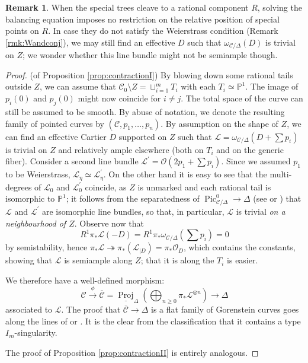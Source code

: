 \documentclass[11pt]{amsart}
\newcommand{\PP}{\mathbb P}
\newcommand{\OO}{\mathcal O}
\renewcommand{\to}{\rightarrow}
\newcommand{\dvr}{\Delta}
\newcommand{\Pic}{\operatorname{Pic}}
\theoremstyle{plain}
\theoremstyle{definition}
\newtheorem{rem}[thm]{Remark}
\begin{document}
\begin{rem}\label{rmk:extra_conjugate}
When the special trees cleave to a rational component $R$, solving the balancing equation imposes no restriction on the relative position of special points on $R$. In case they do not satisfy the Weierstrass condition (Remark \ref{rmk:Wandconj}), we may still find an effective $D$ such that $\omega_{\mathcal C/\dvr}(D)$ is trivial on $Z$; we wonder whether this line bundle might not be semiample though.
\end{rem}


\begin{proof}(of Proposition \ref{prop:contractionI})
 By blowing down some rational tails outside $Z$, we can assume that $\mathcal C_0\setminus Z=\sqcup_{i=1}^m T_i$ with each $T_i\simeq\PP^1$. The image of $p_i(0)$ and $p_j(0)$ might now coincide for $i\neq j$. The total space of the curve can still be assumed to be smooth. By abuse of notation, we denote the resulting family of pointed curves by $(\mathcal C,p_1,\ldots,p_n)$. By assumption on the shape of $Z$, we can find an effective Cartier $D$ supported on $Z$ such that $\mathcal L=\omega_{\mathcal C/\dvr}(D+\sum p_i)$ is trivial on $Z$ and relatively ample elsewhere (both on $T_i$ and on the generic fiber). Consider a second line bundle $\mathcal L^\prime=\OO(2p_1+\sum p_i)$. Since we assumed $p_1$ to be Weierstrass, $\mathcal L_\eta\simeq\mathcal L^\prime_\eta$. On the other hand it is easy to see that the multi-degrees of $\mathcal L_0$ and $\mathcal L^\prime_0$ coincide, as $Z$ is unmarked and each rational tail is isomorphic to $\PP^1$; it follows from the separatedness of $\Pic^0_{\mathcal C/\dvr}\to\dvr$ (see \cite[p. 136]{Deligne-Gabber} or \cite[\S 9.4]{BLR}) that $\mathcal L$ and $\mathcal L^\prime$ are isomorphic line bundles, so that, in particular, $\mathcal L$ is trivial \emph{on a neighbourhood of $Z$}. Observe now that 
 \[R^1\pi_*\mathcal L(-D)= R^1\pi_*\omega_{\mathcal C/\dvr}(\sum p_i)=0\]
 by semistability, hence $\pi_*\mathcal L\twoheadrightarrow \pi_*(\mathcal L_{|D})=\pi_*\OO_D$, which contains the constants, showing that $\mathcal L$ is semiample along $Z$; that it is along the $T_i$ is easier.
 
 We therefore have a well-defined  morphism:
 \[\mathcal C\xrightarrow{\phi}\overline{\mathcal C}=\underline{\operatorname{Proj}}_\dvr\left(\bigoplus_{n\geq 0}\pi_*\mathcal L^{\otimes n}\right)\to\dvr\]
 associated to $\mathcal L$. The proof that $\overline{\mathcal C}\to \dvr$ is a flat family of Gorenstein curves goes along the lines of \cite[Lemma 2.13]{SMY1} or \cite[Proposition 3.7.3.1]{RSPW1}. It is the clear from the classification that it contains a type $I_m$-singularity.
 
 The proof of Proposition \ref{prop:contractionII} is entirely analogous.
\end{proof}
\end{document}
